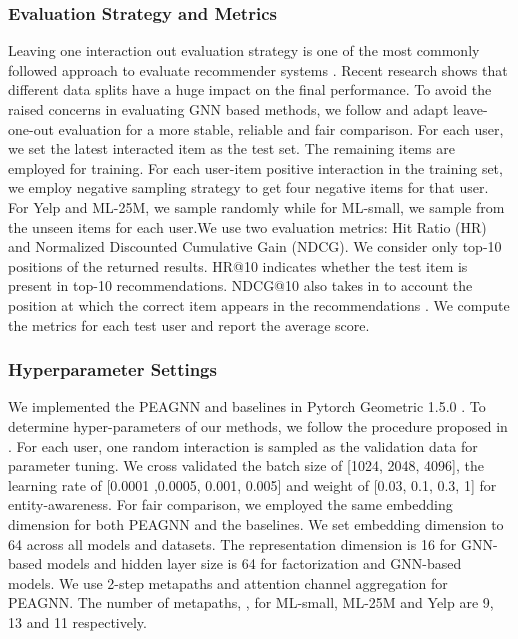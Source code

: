 \documentclass[runningheads, envcountsame, a4paper]{llncs}
\begin{document}
\subsubsection{Evaluation Strategy and Metrics}
Leaving one interaction out evaluation strategy is one of the most
commonly followed approach to evaluate recommender systems \cite{he2017bneural,rendle2012bpr,Bayer2016,hesigir2016}. 
Recent research shows that different data splits have a huge impact on the final performance\cite{shchur2019pitfalls}. 
To avoid the raised concerns in evaluating GNN based methods, we follow \cite{he2017aneural} and adapt leave-one-out evaluation for a more stable, reliable and fair comparison. 
For each user, we set the latest interacted item as the test set. 
The remaining items are employed for training. 
For each user-item positive interaction in the training set, we employ negative sampling strategy to get four negative items for that user. 
For Yelp and ML-25M, we sample randomly while for ML-small, we sample from the unseen items for each user.We use two evaluation metrics: Hit Ratio (HR) and Normalized Discounted Cumulative Gain (NDCG). We consider only top-10 positions of the returned results.
HR@10 indicates whether the test item is present in top-10 recommendations. NDCG@10 also takes in to account the position at which the correct item appears in the recommendations \cite{he2015trirank}.
We compute the metrics for each test user and report the average score.

\subsubsection{Hyperparameter Settings}
We implemented the PEAGNN and baselines in Pytorch Geometric 1.5.0 \cite{Fey/Lenssen/2019}. 
To determine hyper-parameters of our methods, we follow the procedure proposed in \cite{he2017aneural}. For each user, one random interaction is sampled as the validation data for parameter tuning. We cross validated the batch size of [1024, 2048, 4096], the learning rate of [0.0001 ,0.0005, 0.001, 0.005] and weight of [0.03, 0.1, 0.3, 1] for entity-awareness.
For fair comparison, we employed the same embedding dimension for both PEAGNN and the baselines.
We set embedding dimension to 64 across all models and datasets.
The representation dimension is 16 for GNN-based models and hidden layer size is 64 for factorization and GNN-based models. 
We use 2-step metapaths and attention channel aggregation for PEAGNN. 
The number of metapaths, , for ML-small, ML-25M and Yelp are 9, 13 and 11 respectively. 
\end{document}

